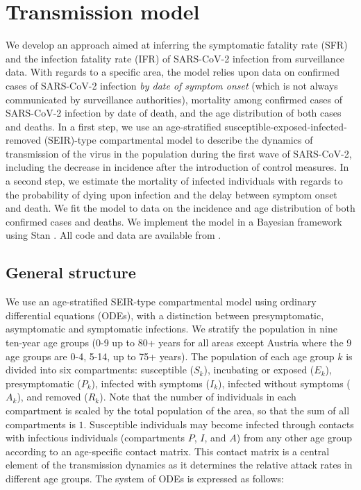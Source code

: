 \documentclass{article}
\begin{document}
	
	\clearpage
	\section{Transmission model}
	\label{model}
	
	We develop an approach aimed at inferring the symptomatic fatality rate (SFR) and the infection fatality rate (IFR) of SARS-CoV-2 infection from surveillance data.
	With regards to a specific area, the model relies upon data on confirmed cases of SARS-CoV-2 infection \textit{by date of symptom onset} (which is not always communicated by surveillance authorities), mortality among confirmed cases of SARS-CoV-2 infection by date of death, and the age distribution of both cases and deaths.
	In a first step, we use an age-stratified susceptible-exposed-infected-removed (SEIR)-type compartmental model to describe the dynamics of transmission of the virus in the population during the first wave of SARS-CoV-2, including the decrease in incidence after the introduction of control measures.
	In a second step, we estimate the mortality of infected individuals with regards to the probability of dying upon infection and the delay between symptom onset and death.
	We fit the model to data on the incidence and age distribution of both confirmed cases and deaths.
	We implement the model in a Bayesian framework using Stan \cite{Carpenter2017}. 
	All code and data are available from \underline{}.
	
	\subsection{General structure}
	
	We use an age-stratified SEIR-type compartmental model using ordinary differential equations (ODEs), with a distinction between presymptomatic, asymptomatic and symptomatic infections. 
	We stratify the population in nine ten-year age groups (0-9 up to 80+ years for all areas except Austria where the 9 age groups are 0-4, 5-14, up to 75+ years). 
	The population of each age group $k$ is divided into six compartments: susceptible ($S_k$), incubating or exposed ($E_k$), presymptomatic ($P_k$), infected with symptoms ($I_k$), infected without symptoms ($A_k$), and removed ($R_k$).
	Note that the number of individuals in each compartment is scaled by the total population of the area, so that the sum of all compartments is $1$.
	Susceptible individuals may become infected through contacts with infectious individuals (compartments $P$, $I$, and $A$) from any other age group according to an age-specific contact matrix.
	This contact matrix is a central element of the transmission dynamics as it determines the relative attack rates in different age groups. 
	The system of ODEs is expressed as follows:
	
\end{document}
